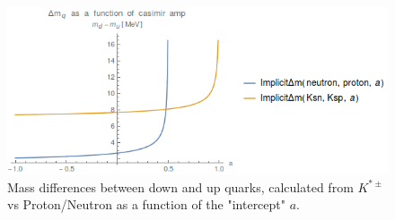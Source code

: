 \documentclass[11pt,a4paper]{article}
\begin{document}
\begin{figure}[h]
\centering
\includegraphics[width=\linewidth]{figures/KaonMassDifferences}
\caption{Mass differences between down and up quarks, calculated from $K^{*\pm}$ vs Proton/Neutron as a function of the "intercept" $a$.}
\label{fig:kaonmassdiff}
\end{figure}
\end{document}
